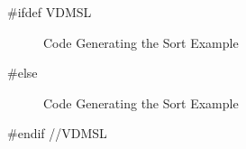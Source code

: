\documentclass[\pformat,12pt]{article}
\begin{document}
#ifdef VDMSL
\begin{figure}[tbh]
\begin{center}
\mbox{}
\caption{Code Generating the Sort Example}\label{fig:cg}
\end{center}
\end{figure}
#else
\begin{figure}[tbh]
\begin{center}
\mbox{}
\caption{Code Generating the Sort Example}\label{fig:cg}
\end{center}
\end{figure}
#endif //VDMSL
\end{document}

